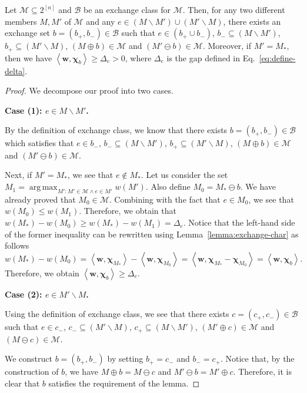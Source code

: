\documentclass{article}
\newcommand{\M}{\mathcal M}
\newcommand{\B}{\mathcal B}
\newcommand{\del}{\backslash}
\DeclareMathOperator*{\argmax}{arg\,max}
\newcommand{\inn}[1]{\left\langle #1 \right\rangle}
\renewcommand{\vec}[1]{\boldsymbol{#1}}
\begin{document}
\begin{lemma}
\label{lemma:exchange}
Let $\M\subseteq 2^{[n]}$ and $\B$ be an exchange class for $\M$.
Then, for any two different members $M,M'$ of $\M$ and any $e \in (M\del M')\cup(M'\del M)$, there exists an exchange set $b=(b_+,b_-) \in \B$ such that
$e\in (b_+\cup b_-)$, $b_-\subseteq (M\del M')$, $b_+\subseteq (M'\del M)$, 
$(M\oplus b) \in \M$ and  $(M'\ominus b) \in \M$.
Moreover, if $M' = M_*$, then we have $\inn{\vec w, \vec \chi_b} \ge \Delta_e > 0$,
where $\Delta_e$ is the gap defined in Eq.~\eqref{eq:define-delta}.
\end{lemma}

\begin{proof}
We decompose our proof into two cases.

\textbf{Case (1): $e\in M\del M'$.}

By the definition of exchange class, we know that 
there exists $b=(b_+, b_-) \in \B$ which satisfies that
$e\in b_-$, $b_- \subseteq (M\del M') $, $b_+\subseteq (M' \del M)$, $(M\oplus b) \in \M$ and $(M'\ominus b) \in \M$.

Next, if $M'=M_*$, we see that $e\not \in M_*$.
Let us consider the set $M_1 = \argmax_{M': M'\in \M \wedge e\in M'} w(M')$.
Also define $M_0 = M_*\ominus b$. 
We have already proved that $M_0\in \M$.  
Combining with the fact that $e\in M_0$, we see that $w(M_0) \le w(M_1)$. 
Therefore, we obtain that
$w(M_*)-w(M_0) \ge w(M_*)-w(M_1) = \Delta_e$.
Notice that the left-hand side of the former inequality can be rewritten using Lemma~\ref{lemma:exchange-char} as follows
$$
w(M_*)-w(M_0) = \inn{\vec w, \vec \chi_{M_*}}-\inn{\vec w, \vec \chi_{M_0}} = \inn{\vec w, \vec \chi_{M_*}-\vec\chi_{M_0}}
= \inn{\vec w,\vec \chi_b}.
$$
Therefore, we obtain $\inn{\vec w,\vec \chi_b} \ge \Delta_e$.

\textbf{Case (2): $e\in M'\del M$.}

Using the definition of exchange class, we see that 
there exists $c=(c_+,c_-)\in \B$ such that 
$e\in c_-$, $c_-\subseteq (M'\del M)$, $c_+\subseteq (M\del M')$, $(M'\oplus c)\in \M$
and $(M\ominus c)\in \M$.

We construct $b=(b_+,b_-)$ by setting $b_+=c_-$ and $b_-=c_+$. 
Notice that, by the construction of $b$, we have $M\oplus b = M\ominus c$ and $M'\ominus b = M'\oplus c$.
Therefore, it is clear that $b$ satisfies the requirement of the lemma.



\end{proof}
\end{document}
